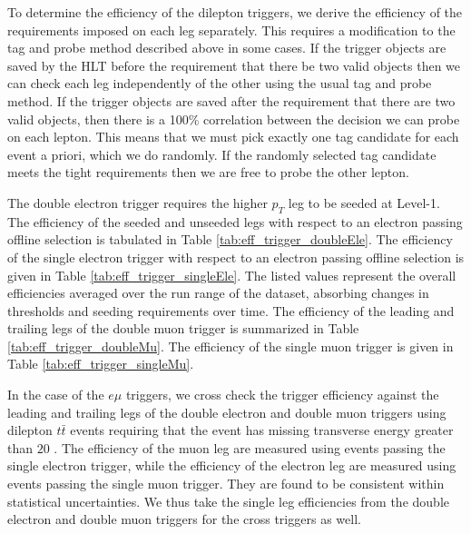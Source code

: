  
To determine the efficiency of the dilepton triggers, 
we derive the efficiency of the requirements imposed on each leg separately.
This requires a modification to the tag and probe method described above in some cases.
If the trigger objects are saved by the HLT before the requirement that there be two valid objects then
we can check each leg independently of the other using the usual tag and probe method.
If the trigger objects are saved after the requirement that there are two valid objects, then there is 
a 100\% correlation between the decision we can probe on each lepton.
This means that we must pick exactly one tag candidate for each event a priori, which we do 
randomly. 
If the randomly selected tag candidate meets the tight requirements then we are free to 
probe the other lepton.

The double electron trigger requires the higher $p_T$ leg to be seeded at Level-1.
The efficiency of the seeded and unseeded legs with respect to an electron passing
offline selection is tabulated in 
Table \ref{tab:eff_trigger_doubleEle}.
The efficiency of the single electron trigger with respect to
an electron passing offline selection is given in Table \ref{tab:eff_trigger_singleEle}.
The listed values represent the overall efficiencies averaged over the run range
of the dataset, absorbing changes in thresholds and seeding requirements
over time.
The efficiency of the leading and trailing legs of the double muon trigger
is summarized in Table \ref{tab:eff_trigger_doubleMu}.
The efficiency of the single
muon trigger is given in Table \ref{tab:eff_trigger_singleMu}.

In the case of the $e\mu$ triggers, we cross check the trigger efficiency 
against the leading and trailing legs of the double electron and
double muon triggers using  
dilepton $t\bar{t}$ events requiring that the event has missing transverse
energy greater than $20$ \GeV. The efficiency of 
the muon leg are measured using events passing the single electron trigger,
while the efficiency of the electron leg are measured using events passing the
single muon trigger. They are found to be consistent within statistical 
uncertainties. We thus take the single leg efficiencies from the double
electron and double muon triggers for the cross triggers as well.

